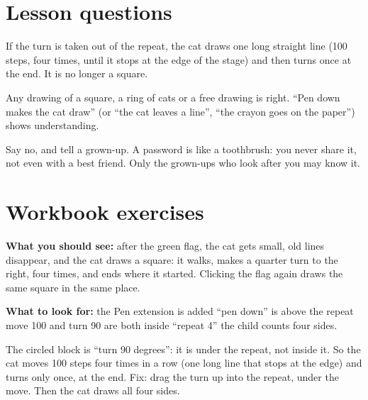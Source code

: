 
\section{Lesson questions}
\begin{answer}
If the turn is taken out of the repeat, the cat draws one long straight line (100 steps, four times, until it stops at the edge of the stage) and then turns once at the end. It is no longer a square.
\end{answer}

\begin{answer}[Reflection]
Any drawing of a square, a ring of cats or a free drawing is right. \enquote{Pen down makes the cat draw} (or \enquote{the cat leaves a line}, \enquote{the crayon goes on the paper}) shows understanding.
\end{answer}

\begin{answer}
Say no, and tell a grown-up. A password is like a toothbrush: you never share it, not even with a best friend. Only the grown-ups who look after you may know it.
\end{answer}

\section{Workbook exercises}
\begin{answer}
\textbf{What you should see:} after the green flag, the cat gets small, old lines disappear, and the cat draws a square: it walks, makes a quarter turn to the right, four times, and ends where it started. Clicking the flag again draws the same square in the same place.

\textbf{What to look for:} \tickbox{} the Pen extension is added \quad \tickbox{} \enquote{pen down} is above the repeat \quad \tickbox{} move 100 and turn 90 are both inside \enquote{repeat 4} \quad \tickbox{} the child counts four sides.
\end{answer}

\begin{answer}
The circled block is \enquote{turn 90 degrees}: it is under the repeat, not inside it. So the cat moves 100 steps four times in a row (one long line that stops at the edge) and turns only once, at the end. Fix: drag the turn up into the repeat, under the move. Then the cat draws all four sides.
\end{answer}

